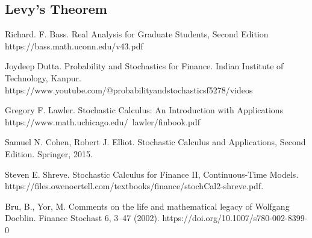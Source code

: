 \documentclass[openany, amssymb, psamsfonts]{amsart}
\theoremstyle{definition}
\numberwithin{equation}{section}
\begin{document}
\subsection{Levy's Theorem}


\begin{thebibliography}{9}

Richard. F. Bass. 
Real Analysis for Graduate Students, Second Edition
https://bass.math.uconn.edu/v43.pdf

Joydeep Dutta.
Probability and Stochastics for Finance.
Indian Institute of Technology, Kanpur.
https://www.youtube.com/@probabilityandstochasticsf5278/videos

Gregory F. Lawler.
Stochastic Calculus: An Introduction with
Applications
https://www.math.uchicago.edu/~lawler/finbook.pdf


Samuel N. Cohen, Robert J. Elliot.
Stochastic Calculus and Applications, Second Edition.
Springer, 2015.

Steven E. Shreve.
Stochastic Calculus for Finance II, Continuous-Time Models.
https://files.owenoertell.com/textbooks/finance/stochCal2-shreve.pdf.

Bru, B., Yor, M. Comments on the life and mathematical legacy of Wolfgang Doeblin. Finance Stochast 6, 3–47 (2002). https://doi.org/10.1007/s780-002-8399-0

\end{thebibliography}
\end{document}
